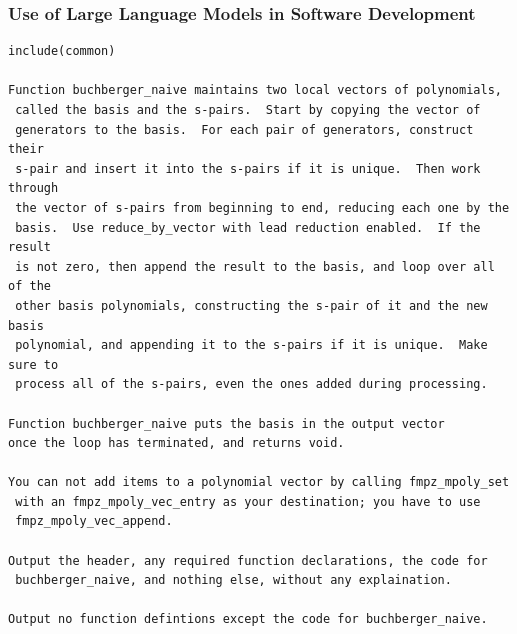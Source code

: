 \documentclass{beamer}
\begin{document}
\begin{frame}[fragile]
\frametitle{Use of Large Language Models in Software Development}
\scriptsize
\begin{verbatim}
include(common)

Function buchberger_naive maintains two local vectors of polynomials,
 called the basis and the s-pairs.  Start by copying the vector of
 generators to the basis.  For each pair of generators, construct their
 s-pair and insert it into the s-pairs if it is unique.  Then work through
 the vector of s-pairs from beginning to end, reducing each one by the
 basis.  Use reduce_by_vector with lead reduction enabled.  If the result
 is not zero, then append the result to the basis, and loop over all of the
 other basis polynomials, constructing the s-pair of it and the new basis
 polynomial, and appending it to the s-pairs if it is unique.  Make sure to
 process all of the s-pairs, even the ones added during processing.

Function buchberger_naive puts the basis in the output vector
once the loop has terminated, and returns void.

You can not add items to a polynomial vector by calling fmpz_mpoly_set
 with an fmpz_mpoly_vec_entry as your destination; you have to use
 fmpz_mpoly_vec_append.

Output the header, any required function declarations, the code for
 buchberger_naive, and nothing else, without any explaination.

Output no function defintions except the code for buchberger_naive.
\end{verbatim}
\end{frame}
\end{document}
